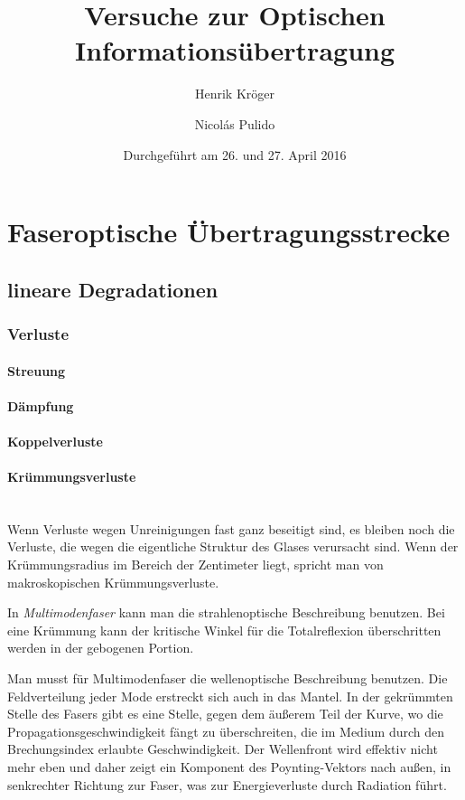 \documentclass[a4paper]{article}
\title{Versuche zur Optischen Informationsübertragung}
\author{Henrik Kröger \and Nicolás Pulido}
\date{Durchgeführt am 26. und 27. April 2016}
\begin{document}


\maketitle


\tableofcontents

\newpage
\section{Faseroptische Übertragungsstrecke}

\subsection{lineare Degradationen}

\subsubsection{Verluste}
\paragraph{Streuung}
\paragraph{Dämpfung}
\paragraph{Koppelverluste}
\paragraph{Krümmungsverluste}
\ \\

\noindent Wenn Verluste wegen Unreinigungen fast ganz beseitigt sind, es
bleiben noch die Verluste, die wegen die eigentliche Struktur des Glases
verursacht sind.  Wenn der Krümmungsradius im Bereich der Zentimeter liegt,
spricht man von makroskopischen Krümmungsverluste. 

In \emph{Multimodenfaser} kann man die strahlenoptische Beschreibung benutzen.
Bei eine Krümmung kann der kritische Winkel für die Totalreflexion
überschritten werden in der gebogenen Portion. 

Man musst für Multimodenfaser die wellenoptische Beschreibung benutzen. Die
Feldverteilung jeder Mode erstreckt sich auch in das Mantel. In der gekrümmten
Stelle des Fasers gibt es eine Stelle, gegen dem äußerem Teil der Kurve, wo die
Propagationsgeschwindigkeit fängt zu überschreiten, die im Medium durch den
Brechungsindex erlaubte Geschwindigkeit. Der Wellenfront wird effektiv nicht
mehr eben und daher zeigt ein Komponent des Poynting-Vektors nach außen, in
senkrechter Richtung zur Faser, was zur Energieverluste durch Radiation führt. 
\end{document}
